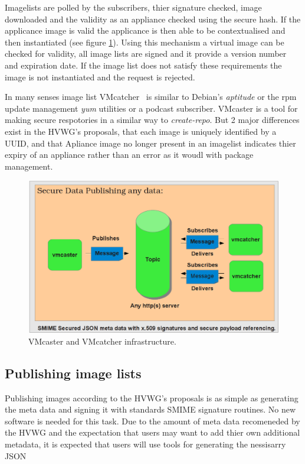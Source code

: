 \documentclass{llncs_Ibergrid2013}
\begin{document}
Imagelists are polled by the subscribers, thier signature checked, image downloaded and the validity as an appliance checked using the secure hash. If the applicance image is valid the applicance is then able to be contextualised and then instantiated (see figure \ref{fig:infrastructure}). 
Using this mechanism a virtual image can be checked for validity, all image lists are signed and it provide a version number and expiration date. If the image list does not satisfy these requirements the image is not instantiated and the request is rejected.

In many senses image list VMcatcher~\cite{vmcatcher} is similar to Debian's \textit{aptitude} or the rpm update management \textit{yum} utilities or a podcast subscriber. VMcaster is a tool for making secure respotories in a similar way to \textit{create-repo}. But 2 major differences exist in the HVWG's proposals, that each image is uniquely identified by a UUID, and that Apliance image no longer present in an imagelist indicates thier expiry of an appliance rather than an error as it woudl with package management.

\begin{figure}[h]
\centering
\includegraphics[width=1\textwidth]{vmcaster_vmcatcher.png}
\caption{VMcaster and VMcatcher infrastructure.}
\label{fig:infrastructure}
\end{figure}

\subsection{Publishing image lists}
Publishing images according to the HVWG's proposals is as simple as generating the meta data and signing it with standards SMIME signature routines. No new software is needed for this task. Due to the amount of meta data recomeneded by the HVWG and the expectation that users may want to add thier own additional metadata, it is expected that users will use tools for generating the nessisarry JSON 
\end{document}

